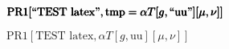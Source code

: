 \documentclass{article}
\begin{document}
\begin{doublespace}
\noindent\(\pmb{\text{PR1}[\text{{``}TEST latex{''}},\text{tmp}=\alpha  T[g,\text{{``}uu{''}}][\mu ,\nu ]}\\
\pmb{]}\)
\end{doublespace}

\begin{doublespace}
\noindent\(\text{PR1}[\text{TEST latex},\alpha  T[g,\text{uu}][\mu ,\nu ]]\)
\end{doublespace}
\end{document}

